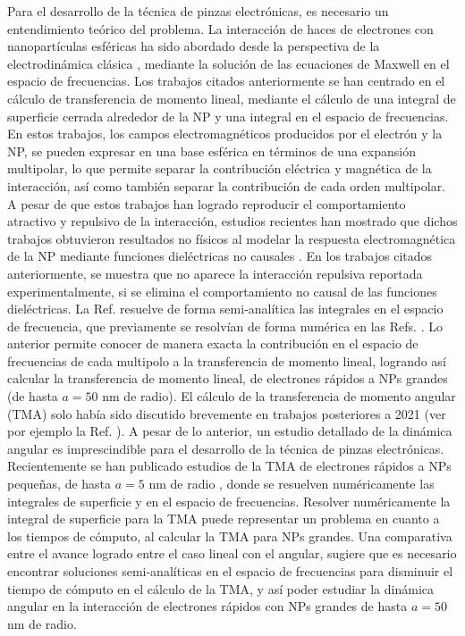 Para el desarrollo de la técnica de pinzas electrónicas, es necesario un entendimiento teórico del problema. La interacción de haces de electrones con nanopartículas esféricas ha sido abordado desde la perspectiva de la electrodinámica clásica \cite{GarciadeAbajo0, PRBCoronado, Lagos2, Batson2, xu2010transmission}, mediante la solución de las ecuaciones de Maxwell en el espacio de frecuencias. Los trabajos citados anteriormente se han centrado en el cálculo de transferencia de momento lineal, mediante el cálculo de una integral de superficie cerrada alrededor de la NP y una integral en el espacio de frecuencias. En estos trabajos, los campos electromagnéticos producidos por el electrón y la NP, se pueden expresar en una base esférica en términos de una expansión multipolar, lo que permite separar la contribución eléctrica y magnética de la interacción, así como también separar la contribución de cada orden multipolar. A pesar de que estos trabajos han logrado reproducir el comportamiento atractivo y repulsivo de la interacción, estudios recientes han mostrado que dichos trabajos obtuvieron resultados no físicos al modelar la respuesta electromagnética de la NP mediante funciones dieléctricas no causales \cite{castrejon2021effects, castrejon2021phdthesis}. En los trabajos citados anteriormente, se muestra que no aparece la interacción repulsiva reportada experimentalmente, si se elimina el comportamiento no causal de las funciones dieléctricas. La Ref. \cite{castrejon2021phdthesis} resuelve de forma semi-analítica las integrales en el espacio de frecuencia, que previamente se resolvían de forma numérica en las Refs. \cite{GarciadeAbajo0, PRBCoronado, Lagos2, Batson2, xu2010transmission}. Lo anterior permite conocer de manera exacta la contribución en el espacio de frecuencias de cada multipolo a la transferencia de momento lineal, logrando así calcular la transferencia de momento lineal, de electrones rápidos a NPs grandes (de hasta $a=50$ nm de radio). El cálculo de la transferencia de momento angular (TMA) solo había sido discutido brevemente en trabajos posteriores a 2021 (ver por ejemplo la Ref. \cite{GarciadeAbajo-1}). A pesar de lo anterior, un estudio detallado de la dinámica angular es imprescindible para el desarrollo de la técnica de pinzas electrónicas. Recientemente se han publicado estudios de la TMA de electrones rápidos a NPs pequeñas, de hasta $a=5$ nm de radio \cite{castellanos2021phdthesis, castellanos2021angular,castellanos2023theory}, donde se resuelven numéricamente las integrales de superficie y en el espacio de frecuencias. Resolver numéricamente la integral de superficie para la TMA puede representar un problema en cuanto a los tiempos de cómputo, al calcular la TMA para NPs grandes. Una comparativa entre el avance logrado entre el caso lineal con el angular, sugiere que es necesario encontrar soluciones semi-analíticas en el espacio de frecuencias para disminuir el tiempo de cómputo en el cálculo de la TMA, y así poder estudiar la dinámica angular en la interacción de electrones rápidos con NPs grandes de hasta $a=50$ nm de radio.

